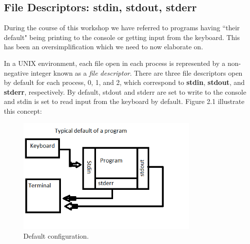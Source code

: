 \documentclass[oneside]{book}
\begin{document}
    \subsection{File Descriptors: stdin, stdout, stderr}
        During the course of this workshop we have referred to programs having ``their default" being printing to the console or getting input from the keyboard. This has been an oversimplification which we need to now elaborate on. 
        
        In a UNIX environment, each file open in each process is represented by a non-negative integer known as a \textit{file descriptor}. There are three file descriptors open by default for each process, 0, 1, and 2, which correspond to \textbf{stdin}, \textbf{stdout}, and \textbf{stderr}, respectively. By default, stdout and stderr are set to write to the console and stdin is set to read input from the keyboard by default. Figure 2.1 illustrate this concept:
        
        \begin{figure}[H]
        	\centering
        	\label{tab:directory_tree}
        	\includegraphics[width=90mm]{stdin_err_out_example.png}
        	\caption{Default configuration.}
        \end{figure}        
     
\end{document}
